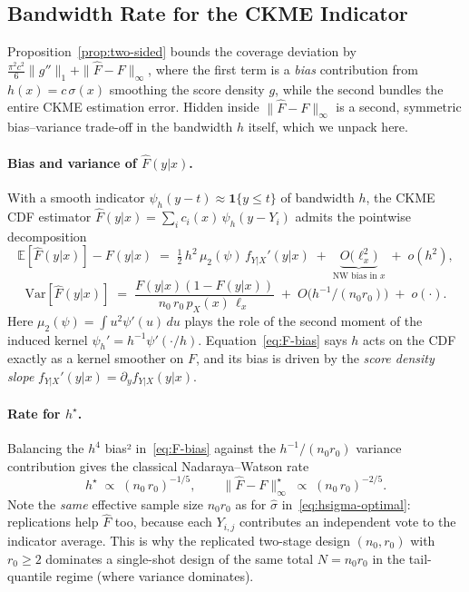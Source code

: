 \documentclass[11pt]{article}
\theoremstyle{remark}
\begin{document}
\subsection{Bandwidth Rate for the CKME Indicator}
\label{sec:h-rate}

Proposition~\ref{prop:two-sided} bounds the coverage deviation by
$\tfrac{\pi^{2} c^{2}}{6}\|g''\|_{1} + \|\widehat F - F\|_{\infty}$,
where the first term is a \emph{bias} contribution from
$h(x) = c\,\sigma(x)$ smoothing the score density $g$, while the
second bundles the entire CKME estimation error. Hidden inside
$\|\widehat F - F\|_{\infty}$ is a second, symmetric bias--variance
trade-off in the bandwidth $h$ itself, which we unpack here.

\paragraph{Bias and variance of $\widehat F(y|x)$.}
With a smooth indicator $\psi_{h}(y - t) \approx \mathbf{1}\{y \le t\}$
of bandwidth $h$, the CKME CDF estimator
$\widehat F(y|x) = \sum_i c_i(x)\,\psi_{h}(y - Y_i)$ admits the
pointwise decomposition
\begin{equation}\label{eq:F-bias}
\boxed{\;
\mathbb{E}[\widehat F(y|x)] - F(y|x)
  \;=\;
  \tfrac{1}{2}\,h^{2}\,\mu_{2}(\psi)\,f_{Y|X}'(y|x)
  \;+\; \underbrace{O\!\bigl(\ell_{x}^{2}\bigr)}_{\text{NW bias in }x}
  \;+\; o(h^{2}),
\;}
\end{equation}
\begin{equation}\label{eq:F-var}
\boxed{\;
\mathrm{Var}[\widehat F(y|x)]
  \;=\;
  \frac{F(y|x)(1 - F(y|x))}{n_0\,r_0\,p_X(x)\,\ell_{x}}
  \;+\; O\!\bigl(h^{-1}/(n_0 r_0)\bigr)
  \;+\; o(\cdot).
\;}
\end{equation}
Here $\mu_{2}(\psi) = \int u^{2}\psi'(u)\,du$ plays the role of the
second moment of the induced kernel
$\psi_{h}' = h^{-1}\psi'(\cdot/h)$. Equation~\eqref{eq:F-bias}
says $h$ acts on the CDF exactly as a kernel smoother on $F$, and
its bias is driven by the \emph{score density slope}
$f_{Y|X}'(y|x) = \partial_{y} f_{Y|X}(y|x)$.

\paragraph{Rate for $h^{\star}$.}
Balancing the $h^{4}$ bias² in~\eqref{eq:F-bias} against the
$h^{-1}/(n_0 r_0)$ variance contribution gives the classical
Nadaraya--Watson rate
\begin{equation}\label{eq:h-optimal}
\boxed{\;
h^{\star}\;\propto\;(n_0\,r_0)^{-1/5},
\qquad
\bigl\|\widehat F - F\bigr\|_{\infty}^{\star}\;\propto\;(n_0\,r_0)^{-2/5}.
\;}
\end{equation}
Note the \emph{same} effective sample size $n_0 r_0$ as for
$\hat\sigma$ in~\eqref{eq:hsigma-optimal}: replications help
$\widehat F$ too, because each $Y_{i,j}$ contributes an independent
vote to the indicator average. This is why the replicated two-stage
design $(n_0, r_0)$ with $r_0 \ge 2$ dominates a single-shot design
of the same total $N = n_0 r_0$ in the tail-quantile regime (where
variance dominates).
\end{document}
